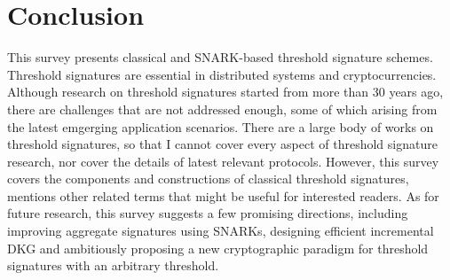 \documentclass[11pt]{article}
\newtheorem{theorem}{Theorem}[section]
\begin{document}
\section{Conclusion}
This survey presents classical and SNARK-based threshold signature schemes. Threshold signatures are essential in distributed systems and cryptocurrencies. Although research on threshold signatures started from more than 30 years ago, there are challenges that are not addressed enough, some of which arising from the latest emgerging application scenarios. There are a large body of works on threshold signatures, so that I cannot cover every aspect of threshold signature research, nor cover the details of latest relevant protocols.  However, this survey covers the components and constructions of classical threshold signatures, mentions other related terms that might be useful for interested readers. As for future research, this survey suggests a few promising directions, including improving aggregate signatures using SNARKs, designing efficient incremental DKG and ambitiously proposing a new cryptographic paradigm for threshold signatures with an arbitrary threshold. 



\newpage



\end{document}
